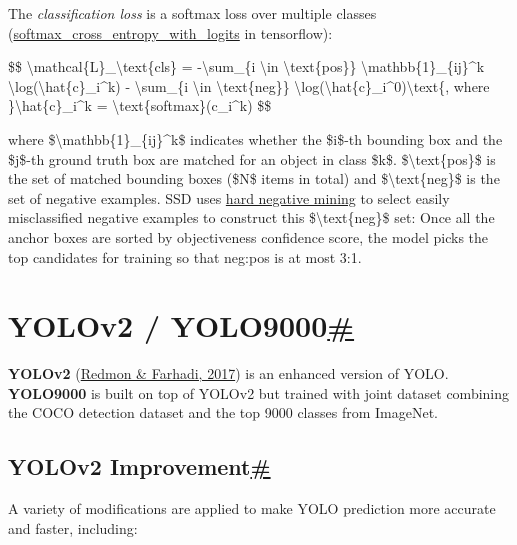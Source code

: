 The \emph{classification loss} is a softmax loss over multiple classes (\href{https://www.tensorflow.org/api_docs/python/tf/nn/softmax_cross_entropy_with_logits}{softmax\_cross\_entropy\_with\_logits} in tensorflow):

\$\$ \textbackslash mathcal\{L\}\_\textbackslash text\{cls\} = -\textbackslash sum\_\{i \textbackslash in \textbackslash text\{pos\}\} \textbackslash mathbb\{1\}\_\{ij\}\^{}k \textbackslash log(\textbackslash hat\{c\}\_i\^{}k) - \textbackslash sum\_\{i \textbackslash in \textbackslash text\{neg\}\} \textbackslash log(\textbackslash hat\{c\}\_i\^{}0)\textbackslash text\{, where \}\textbackslash hat\{c\}\_i\^{}k = \textbackslash text\{softmax\}(c\_i\^{}k) \$\$

where \$\textbackslash mathbb\{1\}\_\{ij\}\^{}k\$ indicates whether the \$i\$-th bounding box and the \$j\$-th ground truth box are matched for an object in class \$k\$. \$\textbackslash text\{pos\}\$ is the set of matched bounding boxes (\$N\$ items in total) and \$\textbackslash text\{neg\}\$ is the set of negative examples. SSD uses \href{https://lilianweng.github.io/posts/2017-12-31-object-recognition-part-3/\#common-tricks}{hard negative mining} to select easily misclassified negative examples to construct this \$\textbackslash text\{neg\}\$ set: Once all the anchor boxes are sorted by objectiveness confidence score, the model picks the top candidates for training so that neg:pos is at most 3:1.

\section{\texorpdfstring{YOLOv2 / YOLO9000\hyperref[yolov2--yolo9000]{\#}}{YOLOv2 / YOLO9000\#}}\label{yolov2--yolo9000}

\textbf{YOLOv2} (\href{https://arxiv.org/abs/1612.08242}{Redmon \& Farhadi, 2017}) is an enhanced version of YOLO. \textbf{YOLO9000} is built on top of YOLOv2 but trained with joint dataset combining the COCO detection dataset and the top 9000 classes from ImageNet.

\subsection{\texorpdfstring{YOLOv2 Improvement\hyperref[yolov2-improvement]{\#}}{YOLOv2 Improvement\#}}\label{yolov2-improvement}

A variety of modifications are applied to make YOLO prediction more accurate and faster, including:

